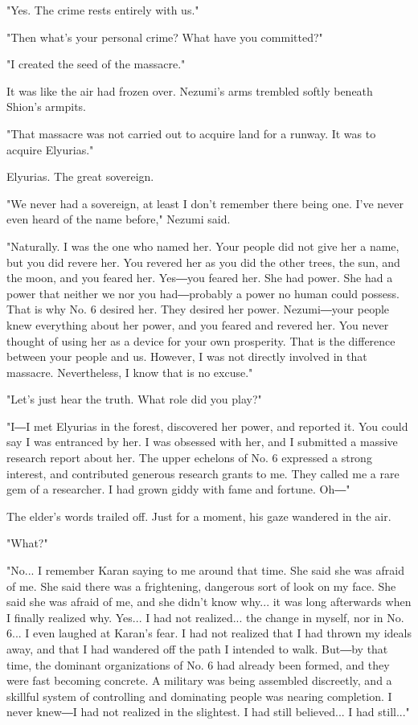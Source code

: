 "Yes. The crime rests entirely with us."

"Then what's your personal crime? What have you committed?"

"I created the seed of the massacre."

It was like the air had frozen over. Nezumi's arms trembled softly
beneath Shion's armpits.

"That massacre was not carried out to acquire land for a runway. It was
to acquire Elyurias."

Elyurias. The great sovereign.

\mybreak

"We never had a sovereign, at least I don't remember there being one.
I've never even heard of the name before," Nezumi said.

"Naturally. I was the one who named her. Your people did not give her a
name, but you did revere her. You revered her as you did the other
trees, the sun, and the moon, and you feared her. Yes―you feared her.
She had power. She had a power that neither we nor you had―probably a
power no human could possess. That is why No. 6 desired her. They
desired her power. Nezumi―your people knew everything about her power,
and you feared and revered her. You never thought of using her as a
device for your own prosperity. That is the difference between your
people and us. However, I was not directly involved in that massacre.
Nevertheless, I know that is no excuse."

"Let's just hear the truth. What role did you play?"

"I―I met Elyurias in the forest, discovered her power, and reported it.
You could say I was entranced by her. I was obsessed with her, and I
submitted a massive research report about her. The upper echelons of No.
6 expressed a strong interest, and contributed generous research grants
to me. They called me a rare gem of a researcher. I had grown giddy with
fame and fortune. Oh―"

The elder's words trailed off. Just for a moment, his gaze wandered in
the air.

"What?"

"No... I remember Karan saying to me around that time. She said she was
afraid of me. She said there was a frightening, dangerous sort of look
on my face. She said she was afraid of me, and she didn't know why... it
was long afterwards when I finally realized why. Yes... I had not
realized... the change in myself, nor in No. 6... I even laughed at
Karan's fear. I had not realized that I had thrown my ideals away, and
that I had wandered off the path I intended to walk. But―by that time,
the dominant organizations of No. 6 had already been formed, and they
were fast becoming concrete. A military was being assembled discreetly,
and a skillful system of controlling and dominating people was nearing
completion. I never knew―I had not realized in the slightest. I had
still believed... I had still..."


